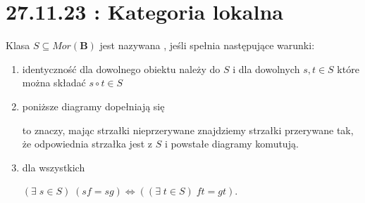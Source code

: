 \section{27.11.23 : Kategoria lokalna}

\begin{definition}
  Klasa $S\subseteq Mor(\mathbf{B})$ jest nazywana , jeśli spełnia następujące warunki:
  \begin{enumerate}
    \item identyczność dla dowolnego obiektu należy do $S$ i dla dowolnych $s,t\in S$ które można składać $s\circ t\in S$
    \item poniższe diagramy dopełniają się
      \begin{center}\end{center}
      to znaczy, mając strzałki nieprzerywane znajdziemy strzałki przerywane tak, że odpowiednia strzałka jest z $S$ i powstałe diagramy komutują.
    \item dla wszystkich  $(\exists\;s\in S)\;(sf=sg)\iff ((\exists\;t\in S)\;ft=gt)$.
  \end{enumerate}
\end{definition}

